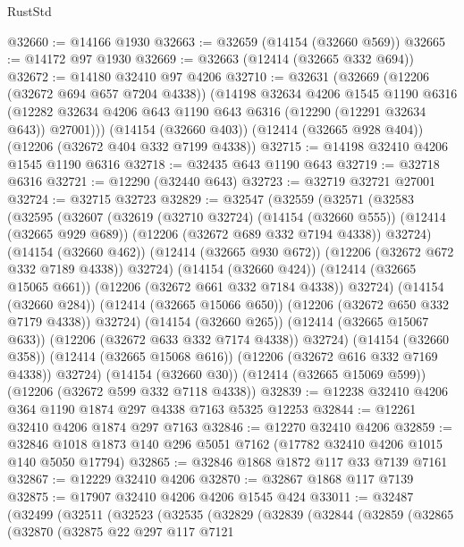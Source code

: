 \begin{lexlean}{RustStd}
\begin{coremodule}
{\begin{coremodule}
{{{{{{{{{{{{{{{{{{{{{{{{{{{{{{{{{{{{{{{{{{{{{{{{{{@32660 := @14166 @1930
@32663 := @32659 (@14154 (@32660 @569))
@32665 := @14172 @97 @1930
@32669 := @32663 (@12414 (@32665 @332 @694))
@32672 := @14180 @32410 @97 @4206
@32710 := @32631
    (@32669
      (@12206 (@32672 @694 @657 @7204 @4338))
      (@14198
        @32634
        @4206
        @1545
        @1190
        @6316
        (@12282 @32634 @4206 @643 @1190 @643 @6316 (@12290 (@12291 @32634 @643)) @27001)))
    (@14154 (@32660 @403))
    (@12414 (@32665 @928 @404))
    (@12206 (@32672 @404 @332 @7199 @4338))
@32715 := @14198 @32410 @4206 @1545 @1190 @6316
@32718 := @32435 @643 @1190 @643
@32719 := @32718 @6316
@32721 := @12290 (@32440 @643)
@32723 := @32719 @32721 @27001
@32724 := @32715 @32723
@32829 := @32547
    (@32559
      (@32571
        (@32583
          (@32595
            (@32607
              (@32619
                (@32710 @32724)
                (@14154 (@32660 @555))
                (@12414 (@32665 @929 @689))
                (@12206 (@32672 @689 @332 @7194 @4338))
                @32724)
              (@14154 (@32660 @462))
              (@12414 (@32665 @930 @672))
              (@12206 (@32672 @672 @332 @7189 @4338))
              @32724)
            (@14154 (@32660 @424))
            (@12414 (@32665 @15065 @661))
            (@12206 (@32672 @661 @332 @7184 @4338))
            @32724)
          (@14154 (@32660 @284))
          (@12414 (@32665 @15066 @650))
          (@12206 (@32672 @650 @332 @7179 @4338))
          @32724)
        (@14154 (@32660 @265))
        (@12414 (@32665 @15067 @633))
        (@12206 (@32672 @633 @332 @7174 @4338))
        @32724)
      (@14154 (@32660 @358))
      (@12414 (@32665 @15068 @616))
      (@12206 (@32672 @616 @332 @7169 @4338))
      @32724)
    (@14154 (@32660 @30))
    (@12414 (@32665 @15069 @599))
    (@12206 (@32672 @599 @332 @7118 @4338))
@32839 := @12238 @32410 @4206 @364 @1190 @1874 @297 @4338 @7163 @5325 @12253
@32844 := @12261 @32410 @4206 @1874 @297 @7163
@32846 := @12270 @32410 @4206
@32859 := @32846 @1018 @1873 @140 @296 @5051 @7162 (@17782 @32410 @4206 @1015 @140 @5050 @17794)
@32865 := @32846 @1868 @1872 @117 @33 @7139 @7161
@32867 := @12229 @32410 @4206
@32870 := @32867 @1868 @117 @7139
@32875 := @17907 @32410 @4206 @4206 @1545 @424
@33011 := @32487
    (@32499
      (@32511
        (@32523
          (@32535
            (@32829
              (@32839
                (@32844
                  (@32859
                    (@32865
                      (@32870
                        (@32875
                          @22
                          @297
                          @117
                          @7121
}}}}}}}}}}}}}}}}}}}}}}}}}}}}}}}}}}}}}}}}}}}}}}}}}}
\end{coremodule}}
\end{coremodule}
\end{lexlean}
